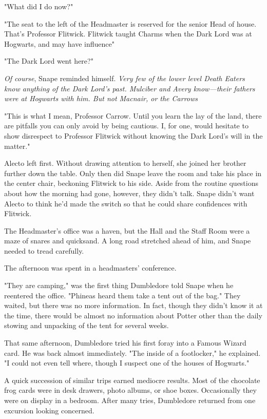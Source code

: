 "What did I do now?"

"The seat to the left of the Headmaster is reserved for the senior Head of house. That's Professor Flitwick. Flitwick taught Charms when the Dark Lord was at Hogwarts, and may have influence{\el}"

"The Dark Lord went here?"

\emph{Of course}, Snape reminded himself. \emph{Very few of the lower level Death Eaters know anything of the Dark Lord's past. Mulciber and Avery know—their fathers were at Hogwarts with him. But not Macnair, or the Carrows{\el}}

"This is what I mean, Professor Carrow. Until you learn the lay of the land, there are pitfalls you can only avoid by being cautious. I, for one, would hesitate to show disrespect to Professor Flitwick without knowing the Dark Lord's will in the matter."

Alecto left first. Without drawing attention to herself, she joined her brother further down the table. Only then did Snape leave the room and take his place in the center chair, beckoning Flitwick to his side. Aside from the routine questions about how the morning had gone, however, they didn't talk. Snape didn't want Alecto to think he'd made the switch so that he could share confidences with Flitwick.

The Headmaster's office was a haven, but the Hall and the Staff Room were a maze of snares and quicksand. A long road stretched ahead of him, and Snape needed to tread carefully.

The afternoon was spent in a headmasters' conference.

"They are camping," was the first thing Dumbledore told Snape when he reentered the office. "Phineas heard them take a tent out of the bag." They waited, but there was no more information. In fact, though they didn't know it at the time, there would be almost no information about Potter other than the daily stowing and unpacking of the tent for several weeks.

That same afternoon, Dumbledore tried his first foray into a Famous Wizard card. He was back almost immediately. "The inside of a footlocker," he explained. "I could not even tell where, though I suspect one of the houses of Hogwarts."

A quick succession of similar trips earned mediocre results. Most of the chocolate frog cards were in desk drawers, photo albums, or shoe boxes. Occasionally they were on display in a bedroom. After many tries, Dumbledore returned from one excursion looking concerned.

